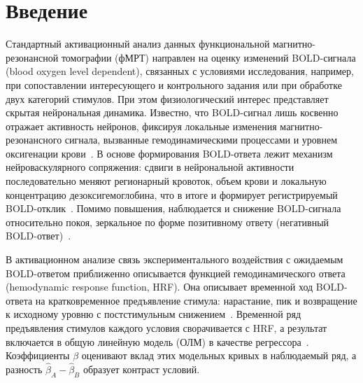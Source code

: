 
\section*{Введение}

Стандартный активационный анализ данных функциональной магнитно-резонансной томографии (фМРТ) направлен на оценку изменений BOLD-сигнала (blood oxygen level dependent), связанных с условиями исследования, например, при сопоставлении интересующего и контрольного задания или при обработке двух категорий стимулов. При этом физиологический интерес представляет скрытая нейрональная динамика. Известно, что BOLD-сигнал лишь косвенно отражает активность нейронов, фиксируя локальные изменения магнитно-резонансного сигнала, вызванные гемодинамическими процессами и уровнем оксигенации крови~\cite{ogawa1990,kwong1992,kireev2013}. В основе формирования BOLD-ответа лежит механизм нейроваскулярного сопряжения: сдвиги в нейрональной активности последовательно меняют регионарный кровоток, объем крови и локальную концентрацию дезоксигемоглобина, что в итоге и формирует регистрируемый BOLD-отклик~\cite{friston2000,buxton2004,mandeville1999}. Помимо повышения, наблюдается и снижение BOLD-сигнала относительно покоя, зеркальное по форме позитивному ответу (негативный BOLD-ответ)~\cite{myznikov2026}.

В активационном анализе связь экспериментального воздействия с ожидаемым BOLD-ответом приближенно описывается функцией гемодинамического ответа (\foreignlanguage{english}{hemodynamic response function}, HRF). Она описывает временной ход BOLD-ответа на кратковременное предъявление стимула: нарастание, пик и возвращение к исходному уровню с постстимульным снижением~\cite{masharipov2025}. Временной ряд предъявления стимулов каждого условия сворачивается с HRF, а результат включается в общую линейную модель (ОЛМ) в качестве регрессора~\cite{friston1998b,friston1994,medvedev2012}. Коэффициенты $\beta$ оценивают вклад этих модельных кривых в наблюдаемый ряд, а разность $\hat\beta_A-\hat\beta_B$ образует контраст условий.

